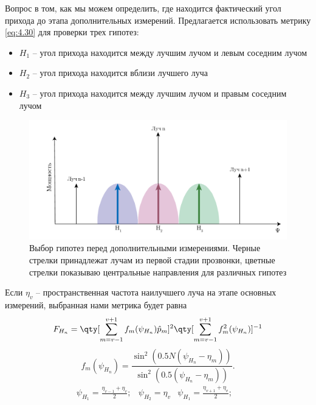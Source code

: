 Вопрос в том, как мы можем определить, где находится фактический угол прихода до этапа дополнительных измерений.
Предлагается использовать метрику \eqref{eq:4.30} для проверки трех гипотез:
\begin{itemize}
    \item $H_1$ -- угол прихода находится между лучшим лучом и левым соседним лучом
    \item $H_2$ -- угол прихода находится вблизи лучшего луча
    \item $H_3$ -- угол прихода находится между лучшим лучом и правым соседним лучом
\end{itemize}

\begin{figure}[ht]
    \centering
    \includegraphics[width=0.75\linewidth]{figs/fig4.13}
    \caption{Выбор гипотез перед дополнительными измерениями. Черные стрелки принадлежат лучам из первой стадии прозвонки, цветные стрелки показываю центральные направления для различных гипотез}
    \label{fig:4.13}
\end{figure}

Если $\eta_v$ --  пространственная частота наилучшего луча на этапе основных измерений, выбранная нами метрика будет равна
\begin{equation}
    \label{eq:4.34}
    F_{H_n} = \qty[\sum\limits_{m=v-1}^{v+1} f_m (\psi_{H_n}) \hat p_m]^2 \qty[\sum\limits_{m=v-1}^{v+1}f_m^2(\psi_{H_n})]^{-1}
\end{equation}
\begin{equation}
    \label{eq:4.35}
    f_m(\psi_{H_n}) = \frac{\sin^2 (0.5N(\psi_{H_n} - \eta_{m}))}{\sin^2(0.5(\psi_{H_n} - \eta_{m}))}.
\end{equation}
\begin{equation}
    \label{eq:4.36}
    \begin{matrix}
        \psi_{H_1} = \frac{\eta_{v-1} + \eta_v}{2}; &
        \psi_{H_2} = \eta_{v}                       &
        \psi_{H_1} = \frac{\eta_{v+1} + \eta_v}{2}; &
    \end{matrix}
\end{equation}



